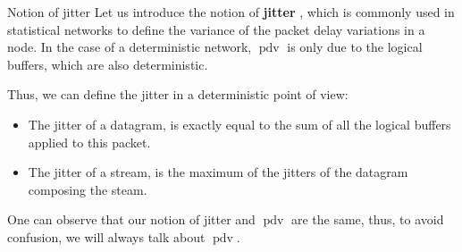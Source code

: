 \documentclass[10pt]{article}
\DeclareMathOperator{\pdv}{pdv}
\begin{document}
\begin{subsection}{Notion of jitter}
Let us introduce the notion of {\bf jitter} \cite{guillemin_peak_1992} , which is commonly used in statistical networks to define the variance of the packet delay variations in a node. In the case of a deterministic network, $\pdv$ is only due to the logical buffers, which are also deterministic. 

Thus, we can define the jitter in a deterministic point of view:
\begin{itemize}
\item The jitter of a datagram, is exactly equal to the sum of all the logical buffers applied to this packet.
\item The jitter of a stream, is the maximum of the jitters of the datagram composing the steam.
\end{itemize}

One can observe that our notion of jitter and $\pdv$ are the same, thus, to avoid confusion, we will always talk about $\pdv$. 

  \end{subsection}
\end{document}
